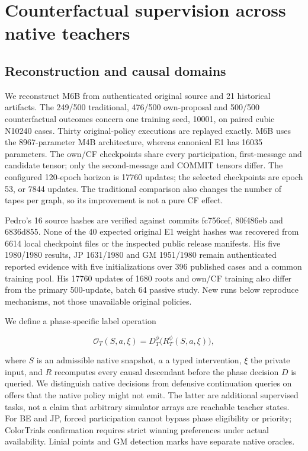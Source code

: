 \section{Counterfactual supervision across native
teachers}\label{counterfactual-supervision-across-native-teachers}

\subsection{Reconstruction and causal
domains}\label{reconstruction-and-causal-domains}

We reconstruct M6B from authenticated original source and 21 historical
artifacts. The 249/500 traditional, 476/500 own-proposal and 500/500
counterfactual outcomes concern one training seed, 10001, on paired
cubic N10240 cases. Thirty original-policy executions are replayed
exactly. M6B uses the 8967-parameter M4B architecture, whereas canonical
E1 has 16035 parameters. The own/CF checkpoints share every
participation, first-message and candidate tensor; only the
second-message and COMMIT tensors differ. The configured 120-epoch
horizon is 17760 updates; the selected checkpoints are epoch 53, or 7844
updates. The traditional comparison also changes the number of tapes per
graph, so its improvement is not a pure CF effect.

Pedro's 16 source hashes are verified against commits fc756cef, 80f486eb
and 6836d855. None of the 40 expected original E1 weight hashes was
recovered from 6614 local checkpoint files or the inspected public
release manifests. His five 1980/1980 results, JP 1631/1980 and GM
1951/1980 remain authenticated reported evidence with five
initializations over 396 published cases and a common training pool. His
17760 updates of 1680 roots and own/CF training also differ from the
primary 500-update, batch 64 passive study. New runs below reproduce
mechanisms, not those unavailable original policies.

We define a phase-specific label operation

\[\mathcal O_T(S,a,\xi)=D_T^\phi\bigl(R_T^\phi(S,a,\xi)\bigr),\]

where \(S\) is an admissible native snapshot, \(a\) a typed
intervention, \(\xi\) the private input, and \(R\) recomputes every
causal descendant before the phase decision \(D\) is queried. We
distinguish native decisions from defensive continuation queries on
offers that the native policy might not emit. The latter are additional
supervised tasks, not a claim that arbitrary simulator arrays are
reachable teacher states. For BE and JP, forced participation cannot
bypass phase eligibility or priority; ColorTrials confirmation requires
strict winning preferences under actual availability. Linial points and
GM detection marks have separate native oracles.

